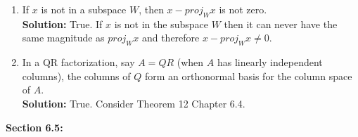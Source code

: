 \documentclass{amsart}
\begin{document}
\begin{enumerate}
\begin{enumerate}
\item If $x$ is not in a subspace $W$, then $x - proj_{W}x$ is not zero.\\
\textbf{Solution: }True. If $x$ is not in the subspace $W$ then it can never have the same magnitude as $proj_{W}x$ and therefore $x - proj_{W}x \neq 0$.
\vspace{1in}

\item In a QR factorization, say $A = QR$ (when $A$ has linearly independent columns), the columns of $Q$ form an orthonormal basis for the column space of $A$.\\
\textbf{Solution: }True. Consider Theorem 12 Chapter 6.4.
\vspace{1in}
\end{enumerate}




{\huge\textbf{Section 6.5:}}\\\\



\end{enumerate}
\end{document}
